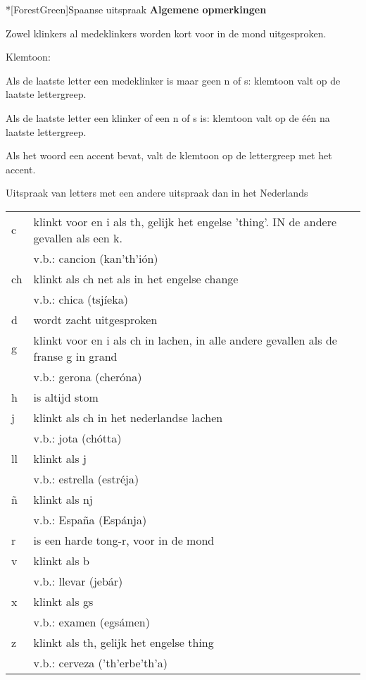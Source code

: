 \begin{song}*[ForestGreen]{Spaanse uitspraak}
\vspace{-20pt}
\textbf{Algemene opmerkingen}
\vspace{-12pt}
\begin{compactenum}
\item Zowel klinkers al medeklinkers worden kort voor in de mond uitgesproken.
\item Klemtoon:
\begin{compactenum}
\item Als de laatste letter een medeklinker is maar geen n of s: klemtoon valt op de laatste lettergreep.
\item Als de laatste letter een klinker of een n of s is: klemtoon valt op de \'e\'en na laatste lettergreep.
\item Als het woord een accent bevat, valt de klemtoon op de lettergreep met het accent.
\end{compactenum}
\end{compactenum}

Uitspraak van letters met een andere uitspraak dan in het Nederlands\\
\begin{tabularx}{1.0\textwidth}{l l}
c & klinkt voor en i als th, gelijk het engelse 'thing'. IN de andere gevallen als een k.\\
 & v.b.: cancion (kan'th'i\'on)\\
ch & klinkt als ch net als in het engelse change\\
 & v.b.: chica (tsj\'ieka)\\
d & wordt zacht uitgesproken\\
g & klinkt voor en i als ch in lachen, in alle andere gevallen als de franse g in grand\\
 & v.b.: gerona (cher\'ona)\\
h & is altijd stom\\
j & klinkt als ch in het nederlandse lachen\\
 & v.b.: jota (ch\'otta)\\
ll & klinkt als j\\
 & v.b.: estrella (estr\'eja)\\
\~{n} & klinkt als nj\\
 & v.b.: Espa\~na (Esp\'anja)\\
r & is een harde tong-r, voor in de mond\\
v & klinkt als b\\
 & v.b.: llevar (jeb\'ar)\\
x & klinkt als gs\\
 & v.b.: examen (egs\'amen)\\
z & klinkt als th, gelijk het engelse thing\\
 & v.b.: cerveza ('th'erbe'th'a)\\
\end{tabularx}


\end{song}
